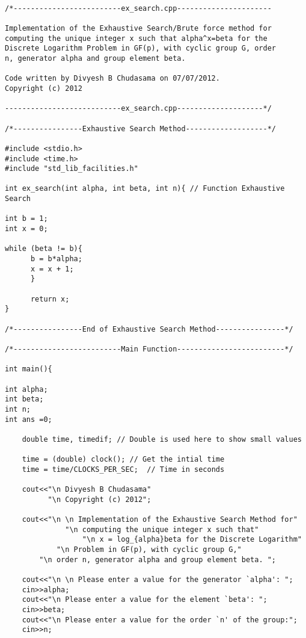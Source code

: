 \documentclass[iwp,first]{luthesis}
\begin{document}
\begin{verbatim}

/*-------------------------ex_search.cpp----------------------

Implementation of the Exhaustive Search/Brute force method for 
computing the unique integer x such that alpha^x=beta for the 
Discrete Logarithm Problem in GF(p), with cyclic group G, order 
n, generator alpha and group element beta.

Code written by Divyesh B Chudasama on 07/07/2012.
Copyright (c) 2012

---------------------------ex_search.cpp--------------------*/

/*----------------Exhaustive Search Method-------------------*/

#include <stdio.h>
#include <time.h>
#include "std_lib_facilities.h"

int ex_search(int alpha, int beta, int n){ // Function Exhaustive Search
    
int b = 1;
int x = 0; 
        
while (beta != b){
      b = b*alpha;
      x = x + 1;
      }
      
      return x;
}

/*----------------End of Exhaustive Search Method----------------*/

/*-------------------------Main Function-------------------------*/

int main(){
    
int alpha;
int beta;
int n;
int ans =0;

    double time, timedif; // Double is used here to show small values

    time = (double) clock(); // Get the intial time
    time = time/CLOCKS_PER_SEC;  // Time in seconds 
    
    cout<<"\n Divyesh B Chudasama"
          "\n Copyright (c) 2012";

    cout<<"\n \n Implementation of the Exhaustive Search Method for" 
	          "\n computing the unique integer x such that" 
		          "\n x = log_{alpha}beta for the Discrete Logarithm" 
		    "\n Problem in GF(p), with cyclic group G," 
	    "\n order n, generator alpha and group element beta. ";	
             
    cout<<"\n \n Please enter a value for the generator `alpha': ";
    cin>>alpha;
    cout<<"\n Please enter a value for the element `beta': ";
    cin>>beta;
    cout<<"\n Please enter a value for the order `n' of the group:";
    cin>>n;
    

\end{verbatim}
\end{document}
